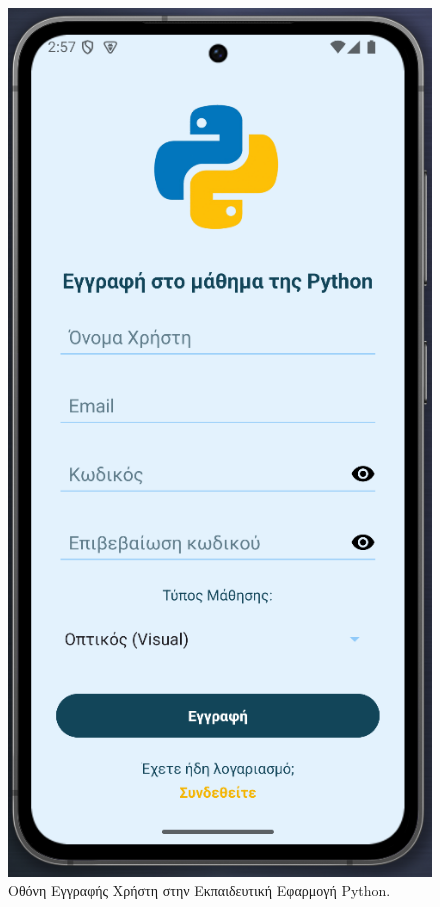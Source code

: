 \documentclass[11pt]{report}
\begin{document}
\begin{figure}[H]
  \centering
  \includegraphics[width=0.9\linewidth, height=0.35\textheight, keepaspectratio]{Figures/s2.png}
  \caption{Οθόνη Εγγραφής Χρήστη στην Εκπαιδευτική Εφαρμογή Python.}
\end{figure}
\end{document}
